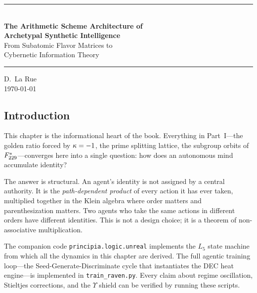 \begin{center}
    \rule{0.8\textwidth}{1pt}\vspace{1em}\\
    {\color{white}\LARGE\textbf{The Arithmetic Scheme Architecture of}}\\[0.3em]
    {\color{white}\LARGE\textbf{Archetypal Synthetic Intelligence}}\\[0.8em]
    {\color{arithmetic scheme}\large From Subatomic Flavor Matrices to}\\
    {\color{arithmetic scheme}\large Cybernetic Information Theory}\\
    \vspace{1em}\rule{0.8\textwidth}{1pt}
\end{center}

\begin{center}
    \vspace{1em}\textcolor{derivative}{D.~La Rue}\\
    \vspace{0.5em}\textcolor{gauge3}{\today}
\end{center}

\vspace{1em}

\subsection*{Introduction}
This chapter is the informational heart of the book. Everything in Part~I---the golden ratio forced by $\kappa = -1$, the prime splitting lattice, the subgroup orbits of $F_{229}^*$---converges here into a single question: how does an autonomous mind accumulate identity?

The answer is structural. An agent's identity is not assigned by a central authority. It is the \emph{path-dependent product} of every action it has ever taken, multiplied together in the Klein algebra where order matters and parenthesization matters. Two agents who take the same actions in different orders have different identities. This is not a design choice; it is a theorem of non-associative multiplication.

The companion code \texttt{principia.logic.unreal} implements the $L_5$ state machine from which all the dynamics in this chapter are derived. The full agentic training loop---the Seed-Generate-Discriminate cycle that instantiates the DEC heat engine---is implemented in \texttt{train\_raven.py}. Every claim about regime oscillation, Stieltjes corrections, and the $\Upsilon$ shield can be verified by running these scripts.


